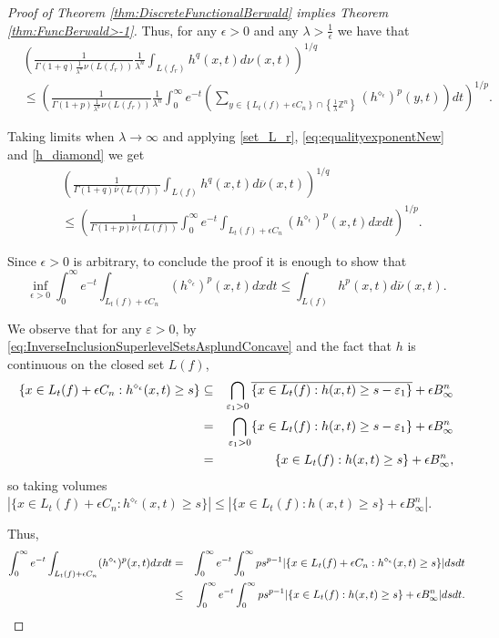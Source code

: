 \documentclass{amsart}
\newcommand{\Z}{\mathbb Z}
\theoremstyle{remark}
\theoremstyle{definition}
\numberwithin{equation}{section}
\begin{document}
\begin{proof}[Proof of Theorem \ref{thm:DiscreteFunctionalBerwald} implies Theorem \ref{thm:FuncBerwald>-1}]
Thus, for any $\epsilon>0$ and any $\lambda>\frac{1}{\epsilon}$  we have that
\begin{align*}
&\left( \frac{1}{\Gamma(1+q) \frac{1}{\lambda^n} \nu(L(f_r)) } \frac{1}{\lambda^n} \int_{L(f_r)}h^q(x,t) d\nu(x,t) \right)^{1/q} \\
&\leq \left( \frac{1}{\Gamma(1+p) \frac{1}{\lambda^n} \nu(L(f_r))} \frac{1}{\lambda^n} \int_0^{\infty} e^{-t} \left(\sum_{y \in \left\{ L_t(f) +\epsilon C_n \right\} \cap \left\{ \frac{1}{\lambda} \Z^n \right\}} (h^{\diamond_{\epsilon}})^p(y,t)\right) dt \right)^{1/p}.
\end{align*}

Taking limits when $\lambda \to \infty$ and applying \eqref{set_L_r}, \eqref{eq:equalityexponentNew} and \eqref{h_diamond} we get
\begin{align*}
&\left( \frac{1}{\Gamma(1+q) \overline{\nu}(L(f))} \int_{L(f)} h^q(x,t) d\overline{\nu}(x,t) \right)^{1/q} \\
&\leq \left( \frac{1}{\Gamma(1+p) \overline{\nu}(L(f))} \int_0^{\infty} e^{-t} \int_{L_t(f)+\epsilon C_n} (h^{\diamond_{\epsilon}})^p(x,t) dx dt \right)^{1/p}.
\end{align*}


Since $\epsilon>0$ is arbitrary, to conclude the proof it is enough to show that
\begin{equation}\label{eq:infimumBerwald}
\inf_{\epsilon>0} \int_0^{\infty} e^{-t} \int_{L_t(f)+\epsilon C_n} (h^{\diamond_{\epsilon}})^p(x,t) dxdt \leq \int_{L(f)}h^p(x,t)d\overline{\nu}(x,t).
\end{equation}

We observe that for any $\varepsilon>0$, by \eqref{eq:InverseInclusionSuperlevelSetsAsplundConcave} and the fact that $h$ is continuous on the closed set $L(f)$,
\begin{eqnarray*}
\{ x \in L_t(f) + \epsilon C_n : h^{\diamond_{\epsilon}}(x,t) \geq s \} &\subseteq& \bigcap_{\varepsilon_1>0}\overline{\{ x \in L_t(f)  : h(x,t) \geq s-\varepsilon_1 \}} +  \epsilon B_{\infty}^n\cr
&=&\bigcap_{\varepsilon_1>0}\{ x \in L_t(f)  : h(x,t) \geq s-\varepsilon_1 \} +  \epsilon B_{\infty}^n\cr
&=&\{ x \in L_t(f)  : h(x,t) \geq s \} +  \epsilon B_{\infty}^n,
\end{eqnarray*}
so taking volumes $|\{ x \in L_t(f) + \epsilon C_n : h^{\diamond_{\epsilon}}(x,t)   \geq s \}| \leq |\{ x \in L_t(f)  : h(x,t) \geq s \} +  \epsilon B_{\infty}^n|$.

Thus,
\begin{eqnarray*}
\int_0^{\infty} e^{-t} \int_{L_t(f)+\epsilon C_n} (h^{\diamond_{\epsilon}})^p (x,t) dxdt &=& \int_0^{\infty} e^{-t} \int_0^{\infty} ps^{p-1} |\{ x \in L_t(f) + \epsilon C_n : h^{\diamond_{\epsilon}}(x,t) \geq s \}| ds dt\cr
&\leq&\int_0^{\infty} e^{-t} \int_0^{\infty} ps^{p-1} |\{ x \in L_t(f)  : h(x,t) \geq s \} +\epsilon B_\infty^n| ds dt.
\end{eqnarray*}


\end{proof}
\end{document}
